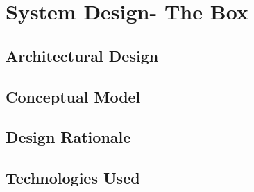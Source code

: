 \chapter{System Design- The Box}

\section{Architectural Design}
\section{Conceptual Model}
\section{Design Rationale}
\section{Technologies Used}